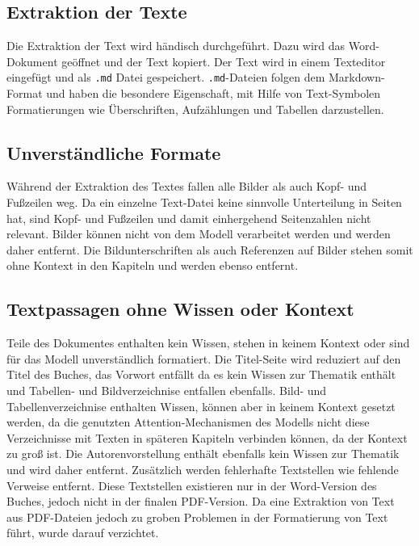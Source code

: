 \subsection{Extraktion der Texte}
Die Extraktion der Text wird händisch durchgeführt.
Dazu wird das Word-Dokument geöffnet und der Text kopiert.
Der Text wird in einem Texteditor eingefügt und als \texttt{.md} Datei gespeichert.
\texttt{.md}-Dateien folgen dem Markdown-Format und haben die besondere Eigenschaft, mit Hilfe von Text-Symbolen Formatierungen wie Überschriften, Aufzählungen und Tabellen darzustellen.

\subsection{Unverständliche Formate}
Während der Extraktion des Textes fallen alle Bilder als auch Kopf- und Fußzeilen weg.
Da ein einzelne Text-Datei keine sinnvolle Unterteilung in Seiten hat, sind Kopf- und Fußzeilen und damit einhergehend Seitenzahlen nicht relevant.
Bilder können nicht von dem Modell verarbeitet werden und werden daher entfernt.
Die Bildunterschriften als auch Referenzen auf Bilder stehen somit ohne Kontext in den Kapiteln und werden ebenso entfernt.

\subsection{Textpassagen ohne Wissen oder Kontext}
Teile des Dokumentes enthalten kein Wissen, stehen in keinem Kontext oder sind für das Modell unverständlich formatiert.
Die Titel-Seite wird reduziert auf den Titel des Buches, das Vorwort entfällt da es kein Wissen zur Thematik enthält und Tabellen- und Bildverzeichnise entfallen ebenfalls.
Bild- und Tabellenverzeichnise enthalten Wissen, können aber in keinem Kontext gesetzt werden, da die genutzten Attention-Mechanismen des Modells nicht diese Verzeichnisse mit Texten in späteren Kapiteln verbinden können, da der Kontext zu groß ist.
Die Autorenvorstellung enthält ebenfalls kein Wissen zur Thematik und wird daher entfernt.
Zusätzlich werden fehlerhafte Textstellen wie fehlende Verweise entfernt.
Diese Textstellen existieren nur in der Word-Version des Buches, jedoch nicht in der finalen PDF-Version.
Da eine Extraktion von Text aus PDF-Dateien jedoch zu groben Problemen in der Formatierung von Text führt, wurde darauf verzichtet.


